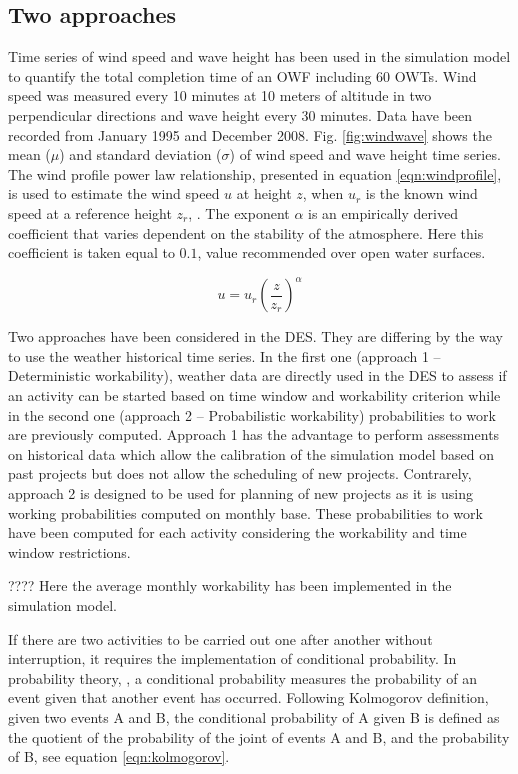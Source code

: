 \subsection{Two approaches}
Time series of wind speed and wave height has been used in the simulation model to quantify the total completion time of an OWF including 60 OWTs. Wind speed was measured every 10 minutes at 10 meters of altitude in two perpendicular directions and wave height every 30 minutes. Data have been recorded from January 1995 and December 2008.
Fig. \ref{fig:windwave} shows the mean ($\mu$) and standard deviation ($\sigma$) of wind speed and wave height time series.
The wind profile power law relationship, presented in equation \ref{eqn:windprofile}, is used to estimate the wind speed $u$ at height $z$, when $u_{r}$ is the known wind speed at a reference height $z_{r}$, \cite{1978Peterson}. The exponent $\alpha$ is an empirically derived coefficient that varies dependent on the stability of the atmosphere. Here this coefficient is taken equal to $0.1$, value recommended over open water surfaces.

\begin{equation}
\label{eqn:windprofile}
u = u_{r} \left( \frac{z}{z_r} \right)^{\alpha}
\end{equation}

Two approaches have been considered in the DES. They are differing by the way to use the weather historical time series. In the first one (approach 1 -- Deterministic workability), weather data are directly used in the DES to assess if an activity can be started based on time window and workability criterion while in the second one (approach 2 -- Probabilistic workability) probabilities to work are previously computed. Approach 1 has the advantage to perform assessments on historical data which allow the calibration of the simulation model based on past projects but does not allow the scheduling of new projects. Contrarely, approach 2 is designed to be used for planning of new projects as it is using working probabilities computed on monthly base. These probabilities to work have been computed for each activity considering the workability and time window restrictions.

???? Here the average monthly workability has been implemented in the simulation model. 

If there are two activities to be carried out one after another without interruption, it requires the implementation of conditional probability.  
In probability theory, \cite{Thalemann2012}, a conditional probability measures the probability of an event given that another event has occurred. Following Kolmogorov definition, given two events A and B, the conditional probability of A given B is defined as the quotient of the probability of the joint of events A and B, and the probability of B, see equation \ref{eqn:kolmogorov}.

